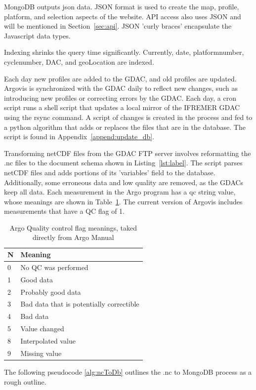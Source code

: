 MongoDB outputs \gls{json} data. JSON format is used to create the map, profile, platform, and selection aspects of the website. API access also uses JSON and will be mentioned in Section~\ref{sec:api}. JSON 'curly braces' encapsulate the Javascript data types. 


Indexing shrinks the query time significantly. Currently, date, platform\textunderscore number, cycle\textunderscore number, DAC, and geoLocation are indexed.

Each day new profiles are added to the GDAC, and old profiles are updated. Argovis is synchronized with the GDAC daily to reflect new changes, such as introducing new profiles or correcting errors by the GDAC. Each day, a \gls{cron} script runs a shell script that updates a local mirror of the IFREMER GDAC using the \gls{rsync} command. A script of changes is created in the process and fed to a python algorithm that adds or replaces the files that are in the database. The script is found in Appendix~\ref{append:update_db}. 

Transforming netCDF files from the GDAC FTP server involves reformatting the .nc files to the document schema shown in Listing~\ref{lst:label}. The script parses netCDF files and adds portions of its 'variables' field to the database. Additionally, some erroneous data and low quality are removed, as the GDACs keep all data. Each measurement in the Argo program has a \gls{qc} string value, whose meanings are shown in Table~\ref{tbl:qc}. The current version of Argovis includes measurements that have a QC flag of 1.

\begin{table}[th]
\centering
\caption{Argo Quality control flag meanings, taked directly from Argo Manual \cite{argo_man}}
\label{tbl:qc}
{\begin{tabular}{ | p{3cm} | p{5cm} |} 
        \hline
        \textbf{N} & \textbf{Meaning} \tabularnewline \hline
        0 & No QC was performed \tabularnewline \hline
        1 & Good data \tabularnewline \hline
        2 & Probably good data \tabularnewline \hline
        3 & Bad data that is potentially correctible \tabularnewline \hline
        4 & Bad data \tabularnewline \hline
        5 & Value changed \tabularnewline \hline
        8 & Interpolated value \tabularnewline \hline
        9 & Missing value \tabularnewline \hline
        \end{tabular}}
\end{table}

The following pseudocode \ref{alg:ncToDb} outlines the .nc to MongoDB process as a rough outline.


